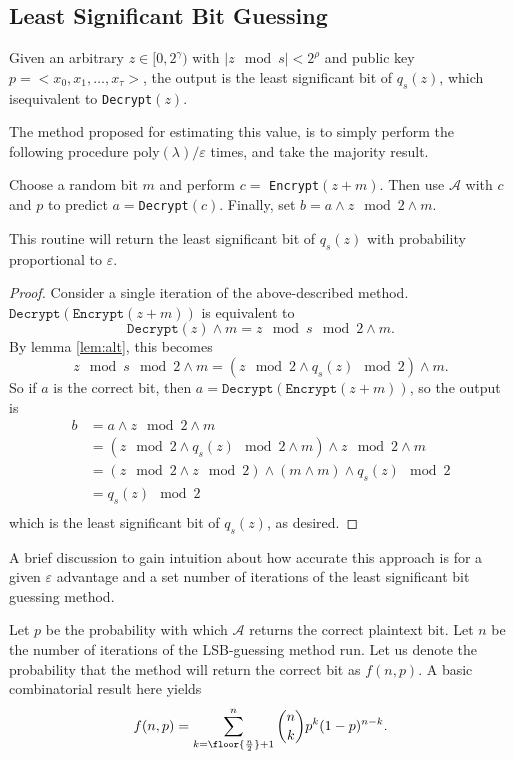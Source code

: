 \documentclass[a4paper,11pt, oneside]{article}
\begin{document}
\subsection{Least Significant Bit Guessing}
   Given an arbitrary $z\in[0,2^\gamma)$ with $|z\mod{s}| < 2^\rho$ and public key $p = <x_0,x_1,\dots,x_\tau>$, the output is the least significant bit of $q_s(z)$, which isequivalent to \texttt{Decrypt}$(z)$.

    The method proposed for estimating this value, is to simply perform the following procedure poly$(\lambda)/\varepsilon$ times, and take the majority result.

    Choose a random bit $m$ and perform $c = $ \texttt{Encrypt}$(z+m)$.  Then use $\mathcal{A}$ with $c$ and $p$ to predict $a = $\texttt{Decrypt}$(c)$.  Finally, set $b = a \wedge z\mod{2} \wedge m$.  
    
\begin{theorem}
    This routine will return the least significant bit of $q_s(z)$ with probability proportional to $\varepsilon$.
\end{theorem}

\begin{proof}
    Consider a single iteration of the above-described method.  $\texttt{Decrypt}(\texttt{Encrypt}(z+m))$ is equivalent to
    \[\texttt{Decrypt}(z)\wedge m = z\mod{s}\mod{2} \wedge m.\]
    By lemma \ref{lem:alt}, this becomes
    \[z\mod{s}\mod{2}\wedge m = \left(z\mod{2}\wedge q_s(z)\mod{2}\right) \wedge m.\]
    So if $a$ is the correct bit, then $a = \texttt{Decrypt}(\texttt{Encrypt}(z+m))$, so the output is
    \begin{align*}
        b &= a \wedge z\mod{2} \wedge m\\
        &=\left( z\mod{2}\wedge q_s(z)\mod{2}\wedge m\right)\wedge z\mod{2}\wedge m\\
        &=\left( z\mod{2}\wedge z\mod{2} \right)\wedge \left( m\wedge m \right) \wedge q_s(z)\mod{2}\\
        &= q_s(z)\mod{2}\\
    \end{align*}
    which is the least significant bit of $q_s(z)$, as desired.
\end{proof}

A brief discussion to gain intuition about how accurate this approach is for a given $\varepsilon$ advantage and a set number of iterations of the least significant bit guessing method.

Let $p$ be the probability with which $\mathcal{A}$ returns the correct plaintext bit.  Let $n$ be the number of iterations of the LSB-guessing method run.  Let us denote the probability that the method will return the correct bit as $f(n,p)$.  A basic combinatorial result here yields
\[
    f(n,p) = \sum_{k=\floor{\frac{n}{2}} + 1}^n \binom{n}{k} p^k(1-p)^{n-k}.
    \]
\end{document}
